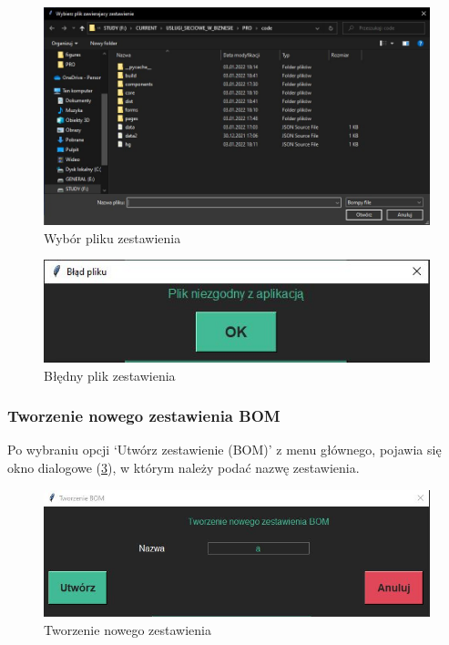 \documentclass[12pt,twoside]{article}
\begin{document}
\begin{figure}[ht]
	\centering
	\includegraphics[width=\textwidth]{figures/app/read_file.jpg}
	\caption{Wybór pliku zestawienia}
\label{fig:app:read_file}
\end{figure}

\begin{figure}[ht]
	\centering
	\includegraphics[width=\textwidth]{figures/app/read_file_err.jpg}
	\caption{Błędny plik zestawienia}
\label{fig:app:read_file_err}
\end{figure}

\subsubsection*{Tworzenie nowego zestawienia BOM}
Po wybraniu opcji \enquote*{Utwórz zestawienie (BOM)} z menu głównego, pojawia się okno dialogowe (\ref{fig:app:create_bom_dialog}), w którym należy podać nazwę zestawienia. 

\begin{figure}[ht]
	\centering
	\includegraphics[width=\textwidth]{figures/app/create_bom_dialog.jpg}
	\caption{Tworzenie nowego zestawienia}
\label{fig:app:create_bom_dialog}
\end{figure}
\end{document}
